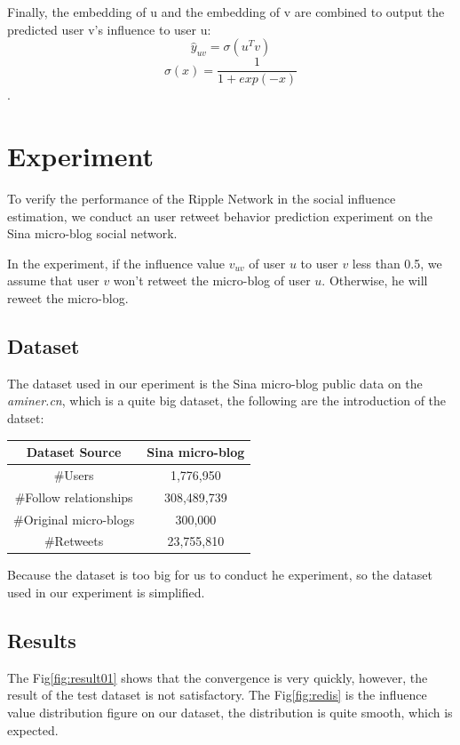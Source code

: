 \documentclass{acmtog} %
\begin{document}
Finally, the embedding of u and the embedding of v are combined to output the predicted user v's influence to user u:
$$\hat{y}_{uv}=\sigma(u^T v)$$
$$\sigma(x)=\frac{1}{1+exp(-x)}$$.

\section{Experiment}
To verify the performance of the Ripple Network in the social influence estimation, we conduct an user retweet behavior prediction experiment on the Sina micro-blog social network.

In the experiment, if the influence value $v_{uv}$ of user $u$ to user $v$ less than 0.5, we assume that user $v$ won't retweet the micro-blog of user $u$. Otherwise, he will reweet the micro-blog.

\subsection{Dataset}
The dataset used in our eperiment is the Sina micro-blog public data on the \emph{aminer.cn}, which is a quite big dataset, the following are the introduction of the datset:

\begin{table}[htp]
\centering
\begin{tabular}{|c|c|}
 \hline
 Dataset Source &Sina micro-blog \\
 \hline
\#Users & 1,776,950  \\
 \hline
\#Follow relationships & 308,489,739  \\
 \hline
\#Original micro-blogs & 300,000 \\
\hline
\#Retweets & 23,755,810 \\
 \hline
\end{tabular}
\end{table}

Because the dataset is too big for us to conduct he experiment, so the dataset used in our experiment is simplified. 



\subsection{Results}
The Fig\ref{fig:result01} shows that the convergence is very quickly, however, the result of the test dataset is not satisfactory. The Fig\ref{fig:redis} is the influence value distribution figure on our dataset, the distribution is quite smooth, which is expected.
\end{document}
